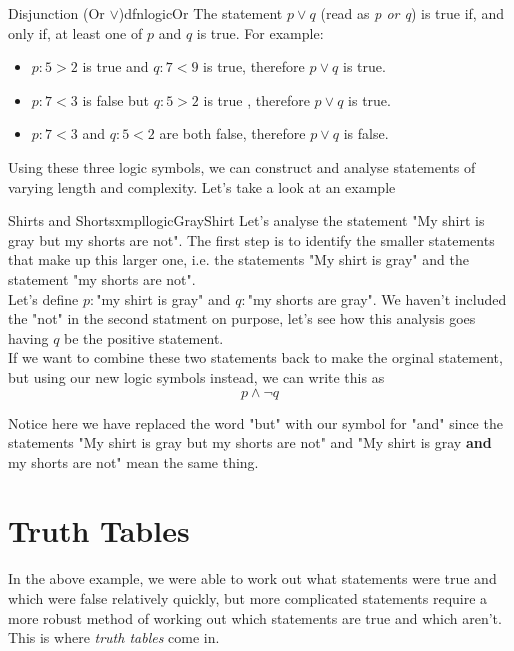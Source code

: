 \begin{dfn}[label={def:logicOr}]{Disjunction (Or $\lor$)}{dfnlogicOr}
    The statement $p \lor q$ (read as \emph{p or q}) is true if, and only if, at least one of $p$ and $q$ is true. For example:
    \begin{itemize}
        \item $p:5 > 2$ is true and $q: 7< 9$ is true, therefore $p \lor q$ is true.
        \item $p: 7< 3$ is false but $q:5 > 2$ is true , therefore $p \lor q$ is true.
        \item $p:7 < 3$ and $q: 5 < 2$ are both false, therefore $p \lor q$ is false.
    \end{itemize}
\end{dfn}

Using these three logic symbols, we can construct and analyse statements of varying length and complexity. Let's take a look at an example

\begin{exmpl}[label={exmpl:logicGrayShirt}]{Shirts and Shorts}{xmpllogicGrayShirt}
    Let's analyse the statement "My shirt is gray but my shorts are not". The first step is to identify the smaller statements that make up this larger one, i.e. the statements "My shirt is gray" and the statement "my shorts are not".\\

    Let's define $p:$"my shirt is gray" and $q:$"my shorts are gray". We haven't included the "not" in the second statment on purpose, let's see how this analysis goes having $q$ be the positive statement.\\

    If we want to combine these two statements back to make the orginal statement, but using our new logic symbols instead, we can write this as
    $$ p \land \lnot q$$

    Notice here we have replaced the word "but" with our symbol for "and" since the statements  "My shirt is gray but my shorts are not" and "My shirt is gray \textbf{and} my shorts are not" mean the same thing.
\end{exmpl}

\section{Truth Tables}
In the above example, we were able to work out what statements were true and which were false relatively quickly, but more complicated statements require a more robust method of working out which statements are true and which aren't. This is where \emph{truth tables} come in.\\

